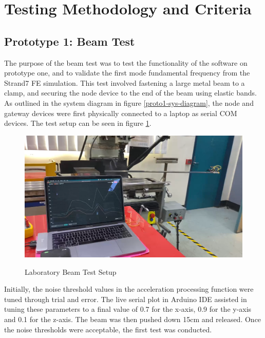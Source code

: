\section{Testing Methodology and Criteria}
\subsection{Prototype 1: Beam Test}

The purpose of the beam test was to test the functionality of the software on prototype one, and to validate the first mode fundamental frequency from the Strand7 FE simulation. This test involved fastening a large metal beam to a clamp, and securing the node device to the end of the beam using elastic bands. As outlined in the system diagram in figure \ref{proto1-sys-diagram}, the node and gateway devices were first physically connected to a laptop as serial COM devices. The test setup can be seen in figure \ref{beam-test-setup}. 

\begin{figure}[H] 
	\centering
	\caption{Laboratory Beam Test Setup}
	\includegraphics[width=\textwidth]{Sections/Prototype-Testing/beam-test-setup.png}
	\label{beam-test-setup}
\end{figure}

Initially, the noise threshold values in the acceleration processing function were tuned through trial and error. The live serial plot in Arduino IDE assisted in tuning these parameters to a final value of 0.7 for the x-axis, 0.9 for the y-axis and 0.1 for the z-axis. The beam was then pushed down 15cm and released. Once the noise thresholds were acceptable, the first test was conducted. 

